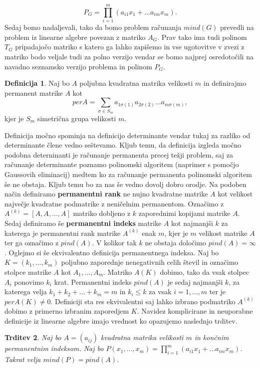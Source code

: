 \documentclass[12pt,a4paper,twoside]{article}
\theoremstyle{definition} %
\newtheorem{definicija}{Definicija}[section]
\theoremstyle{plain} %
\newtheorem{trditev}[definicija]{Trditev}
\numberwithin{equation}{section}  %
\begin{document}
$$P_G = \prod_{i=1}^m (a_{i1}x_1 + \ldots a_{im}x_m).$$
Sedaj bomo nadaljevali, tako da bomo problem računanja $mind(G)$ prevedli na problem iz linearne algebre povezan z matriko $A_G$. Prav tako ima tudi polinom $T_G$ pripadajočo matriko s katero ga lahko zapišemo in vse ugotovitve v zvezi z matriko bodo veljale tudi za polno verzijo vendar se bomo najprej osredotočili na navadno seznamsko verzijo problema in polinom $P_G$.
 \begin{definicija}
Naj bo $A$ poljubna kvadratna matrika velikosti $m$ in definirajmo permanent matrike $A$ kot 
$$ perA = \sum_{\sigma \in S_m} a_{1\sigma(1)} a_{2\sigma(2)} \ldots a_{m\sigma(m)} ,$$
kjer je $S_m$ simetrična grupa velikosti $m$.
\end{definicija}
Definicija močno spominja na definicijo determinante vendar tukaj za razliko od determinante člene vedno seštevamo. Kljub temu, da definicija izgleda močno podobna deterninanti je računanje permanenta precej težji problem, saj za računanje determinante poznamo polinomski algoritem (naprimer s pomočjo Gaussovih eliminacij) medtem ko za računanje permanenta polinomski algoritem še ne obstaja. Kljub temu bo za nas še vedno dovolj dobro orodje. Na podoben način definiramo \textbf{permanentni rank} ne nujno kvadratne matrike $A$ kot velikost največje kvadratne podmatrike z neničelnim permanentom. Označimo  z $A^{(k)} = [A,A, \ldots, A]$ matriko dobljeno z $k$ zaporednimi kopijami matrike $A$. Sedaj definiramo še \textbf{permanentni indeks} matrike $A$ kot najmanjši $k$ za katerega je permanentni rank matrike $A^{(k)}$ enak $m$, kjer je $m$ velikost matrike $A$ ter ga označimo z $pind(A)$. V kolikor tak $k$ ne obstaja določimo $pind(A) = \infty$. Oglejmo si še ekvivalentno definicija permanentnega indeksa. Naj bo $K = (k_1, \ldots, k_m)$ poljubno zaporednje nenegativnih celih števil in označimo stolpce matrike $A$ kot $A_1, \ldots, A_m$. Matriko $A(K)$ dobimo, tako da vsak stolpec $A_i$ ponovimo $k_i$ krat. Permanentni indeks $pind(A)$ je sedaj najmanjši $k$, za katerega velja $k_1 + k_2 + \ldots + k_m = m$ in $k_i \le k$ za vsak $i = 1, \ldots, m$ ter je $per A(K) \neq 0$. Definiciji sta res ekvivalentni saj lahko izbrano podmatriko $A^{(k)}$ dobimo z primerno izbranim zaporedjem $K$. Navidez komplicirane in neuporabne definicije iz linearne algebre imajo vrednost ko opazujemo naslednjo trditev.

\begin{trditev}
\label{mpind}
Naj bo $A = (a_{ij})$ kvadratna matrika velikosti $m$ in končnim permanentnim indeksom. Naj bo $P(x_1, \ldots, x_m) = \prod_{i=1}^m (a_{i1}x_1 + \ldots a_{im}x_m)$. Takrat velja $mind(P) = pind(A)$.
\end{trditev}
\end{document}
